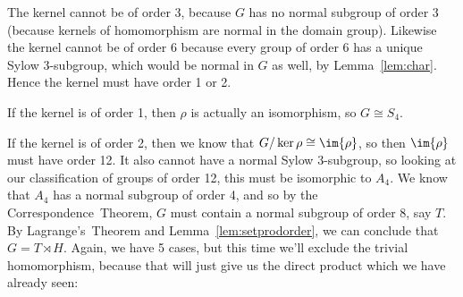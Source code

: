 The kernel cannot be of order 3, because \(G\) has no normal subgroup of order 3 (because kernels of homomorphism are
normal in the domain group).
Likewise the kernel cannot be of order 6 because every group of order 6 has a unique Sylow 3-subgroup, which would be
normal in \(G\) as well, by Lemma~\ref{lem:char}.
Hence the kernel must have order 1 or 2.

If the kernel is of order 1, then \(\rho\) is actually an isomorphism, so \(G \cong S_4\).

If the kernel is of order 2, then we know that \(G/\ker{\rho} \cong \im{\rho}\), so then \(\im{\rho}\) must have order
12.
It also cannot have a normal Sylow 3-subgroup, so looking at our classification of groups of order 12, this must be
isomorphic to \(A_4\).
We know that \(A_4\) has a normal subgroup of order 4, and so by the Correspondence~Theorem, \(G\) must contain a normal
subgroup of order 8, say \(T\).
By Lagrange's~Theorem and Lemma~\ref{lem:setprodorder}, we can conclude that \(G = T \rtimes H\).
Again, we have 5 cases, but this time we'll exclude the trivial homomorphism, because that will just give us the direct
product which we have already seen:


